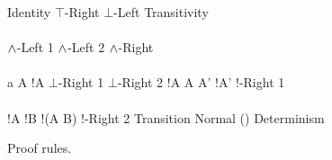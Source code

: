 \begin{FIGURE}
\begin{RULES}

  \ZEROPREMISERULENAMEDRIGHT
  {
    \phi \judge \phi
  }{Identity}
    \quad
  \ZEROPREMISERULENAMEDRIGHT
  {
    \phi \judge \top
  }{$\top$-Right}
    \quad
  \ZEROPREMISERULENAMEDRIGHT
  {
    \bot \judge \phi
  }{$\bot$-Left}
    \quad
  \TWOPREMISERULENAMEDRIGHT
  {
    \phi \judge \psi
  }
  {
    \psi \judge \xi
  }
  {
    \phi \judge \xi
  }{Transitivity}
    \\\\
  \ONEPREMISERULENAMEDRIGHT
  {
    \phi \judge \psi
  }
  {
    \phi \AND \xi \judge \psi
  }{$\land$-Left 1}
     \quad
  \ONEPREMISERULENAMEDRIGHT
  {
    \phi \judge \psi
  }
  {
    \xi \AND \phi  \judge \psi
  }{$\land$-Left 2}
     \quad
  \TWOPREMISERULENAMEDRIGHT
  {
    \phi \judge \psi
  }
  {
    \phi \judge \xi
  }
  {
    \phi \judge \psi \AND \xi
  }{$\land$-Right}
     \\\\
     \ONEPREMISERULENAMEDRIGHT
     {
       a \notin A
     }
     {
       !A \AND {} \judge \bot
     }{$\bot$-Right 1}
        \quad
     \ZEROPREMISERULENAMEDRIGHT
     {
        \judge \bot
     }{$\bot$-Right 2}
     \quad
     \TWOPREMISERULENAMEDRIGHT
     {
       \phi \judge !A
     }
     {
       A \subseteq A'
     }
     {
       \phi \judge!A'
     }{!-Right 1}
     \\\\
     \TWOPREMISERULENAMEDRIGHT
     {
       \phi \judge !A
     }
     {
       \phi \judge !B
     }
     {
       \phi \judge !(A \cap B)
     }{!-Right 2}
     \quad
     \ONEPREMISERULENAMEDRIGHT
     {
       \phi \judge \psi
     }
     {
        \judge {}
     }{Transition Normal}
     \quad
     \ONEPREMISERULENAMEDRIGHT
     {
       \phi \judge {}\psi \land {}\xi
     }
     {
       \phi \judge {}(\psi \land \xi)
     }{Determinism}
\end{RULES}
\caption{Proof rules.}\label{figure:elAndBangRules}
\end{FIGURE}
